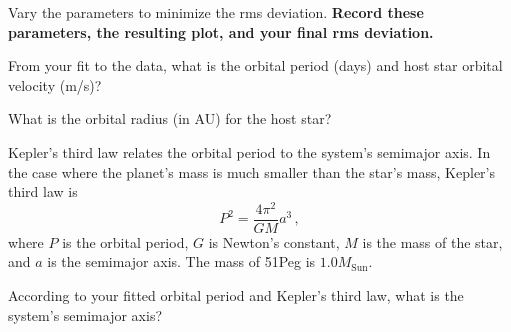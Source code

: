 \begin{steps}
	\item Vary the parameters to minimize the rms deviation. \textbf{Record these parameters, the resulting plot, and your final rms deviation.}
\end{steps}

%

\begin{steps}
	\item From your fit to the data, what is the orbital period (days) and host star orbital velocity (m/s)?
	
	\item What is the orbital radius (in AU) for the host star?
\end{steps}

Kepler's third law relates the orbital period to the system's semimajor axis. In the case where the planet’s mass is much smaller than the star’s mass, Kepler's third law is
\begin{equation}
 P^2=\frac{4 \pi^2}{GM} a^3 \,,
\end{equation}
where $P$ is the orbital period, $G$ is Newton's constant, $M$ is the mass of the star, and $a$ is the semimajor axis. The mass of 51Peg is $1.0 M_\textrm{Sun}$.

\begin{steps}
	\item According to your fitted orbital period and Kepler's third law, what is the system's semimajor axis?
\end{steps}

